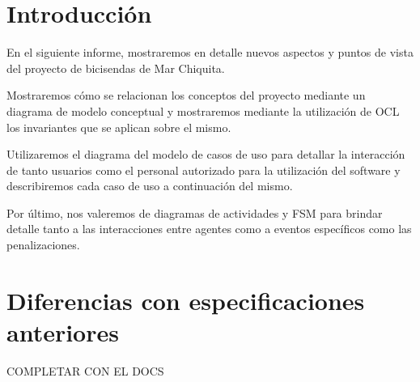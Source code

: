 \documentclass[a4paper, 10pt, twoside]{article}
\begin{document}
\newpage




\tableofcontents

\newpage




\section{Introducción}

En el siguiente informe, mostraremos en detalle nuevos aspectos y puntos de vista del proyecto de bicisendas de Mar Chiquita.

Mostraremos cómo se relacionan los conceptos del proyecto mediante un diagrama de modelo conceptual y mostraremos mediante la utilización de OCL los invariantes que se aplican sobre el mismo.

Utilizaremos el diagrama del modelo de casos de uso para detallar la interacción de tanto usuarios como el personal autorizado para la utilización del software y describiremos cada caso de uso a continuación del mismo.

Por último, nos valeremos de diagramas de actividades y FSM para brindar detalle tanto a las interacciones entre agentes como a eventos específicos como las penalizaciones.



\section{Diferencias con especificaciones anteriores}
COMPLETAR CON EL DOCS



\end{document}
